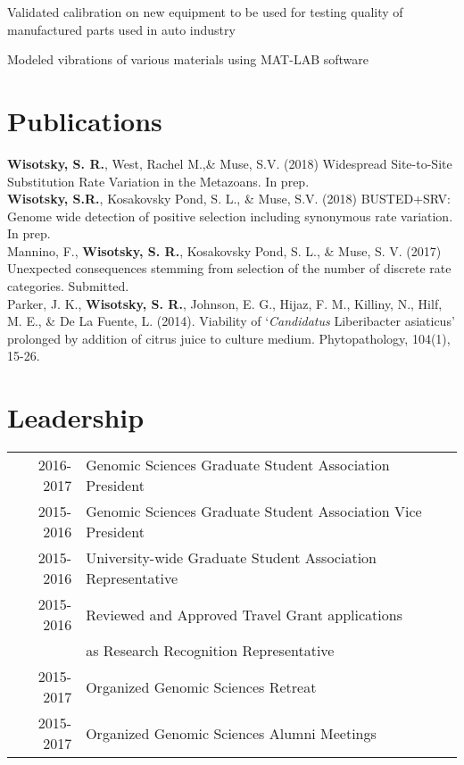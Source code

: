 \documentclass[]{deedy-resume-openfont}
\begin{document}
\begin{minipage}[t]{0.65\textwidth}
\begin{tightemize}
\item {Validated calibration on new equipment to be used for testing quality of manufactured parts used in auto industry}
\item {Modeled vibrations of various materials using MAT-LAB software}
\end{tightemize}
\sectionsep

\section{Publications}
\textbf{Wisotsky, S. R.}, West, Rachel M.,\& Muse, S.V. (2018) Widespread Site-to-Site Substitution Rate Variation in the Metazoans. In prep.\\
\vspace{3pt}
\textbf{Wisotsky, S.R.}, Kosakovsky Pond, S. L., \& Muse, S.V. (2018) BUSTED+SRV: Genome wide detection of positive selection including synonymous rate variation. In prep. \\
\vspace{3pt}
Mannino, F., \textbf{Wisotsky, S. R.}, Kosakovsky Pond, S. L., \& Muse, S. V. (2017) Unexpected consequences stemming from selection of the number of discrete rate categories. Submitted.   \\
\vspace{3pt}
Parker, J. K., \textbf{Wisotsky, S. R.}, Johnson, E. G., Hijaz, F. M., Killiny, N., Hilf, M. E., \& De La Fuente, L. (2014). Viability of ‘\textit{Candidatus} Liberibacter asiaticus’ prolonged by addition of citrus juice to culture medium. Phytopathology, 104(1), 15-26.\\
\sectionsep



\section{Leadership} 

\begin{tabular}{rll}
2016-2017 	& Genomic Sciences Graduate Student Association President  \\
2015-2016   & Genomic Sciences Graduate Student Association Vice President \\
2015-2016   & University-wide Graduate Student Association Representative \\
2015-2016   & Reviewed and Approved Travel Grant applications \\
			& as Research Recognition Representative \\
2015-2017	& Organized Genomic Sciences Retreat \\
2015-2017   & Organized Genomic Sciences Alumni Meetings \\
\end{tabular}
\sectionsep

\end{minipage} 
\end{document}
